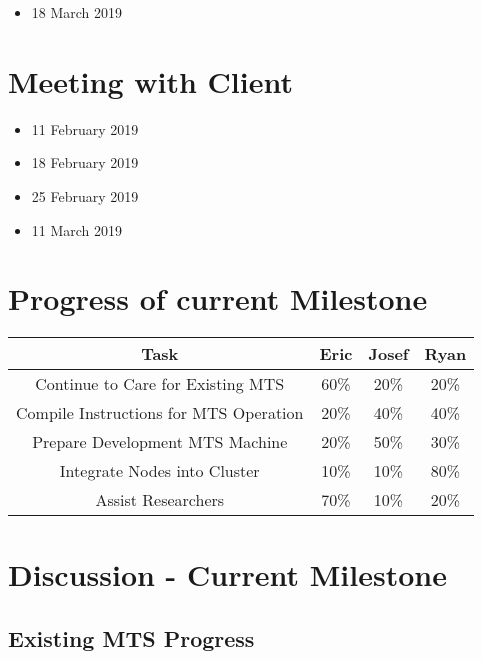 \documentclass[12pt]{article}
\newcommand\tab[1][1cm]{\hspace*{#1}}
\begin{document}
\begin{itemize}
	\item 18 March 2019
\end{itemize}
\section{Meeting with Client}

\begin{itemize}
	\item 11 February 2019
	\item 18 February 2019
	\item 25 February 2019
	\item 11 March 2019
\end{itemize}

\section{Progress of current Milestone}

\begin{adjustwidth}{-3.5cm}{}
  \begin{center}
      \begin{tabular}{|c|c|c|c|}
    	\hline
    	Task & Eric & Josef & Ryan \\
    	\hline
    	Continue to Care for Existing MTS & 60\% & 20\% & 20\% \\
    	Compile Instructions for MTS Operation & 20\% & 40\% & 40\% \\
    	Prepare Development MTS Machine & 20\% & 50\% & 30\% \\
    	Integrate Nodes into Cluster & 10\% & 10\% & 80\% \\
    	Assist Researchers & 70\% & 10\% & 20\% \\
    	\hline
    \end{tabular}
  \end{center}
\end{adjustwidth}



\section{Discussion - Current Milestone}

\subsection{Existing MTS Progress}

\tab 
\end{document}
